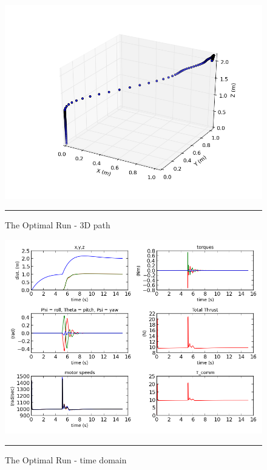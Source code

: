 \begin{figure}[htbp]
	\centering
		\includegraphics[width=\textwidth]{Figures/optimal_run_3D_path.png}
		\rule{35em}{0.5pt}
	\caption[optimal run 3D path]{The Optimal Run - 3D path}
	\label{fig:optimal run 3D path}
\end{figure}


\begin{figure}[htbp]
	\centering
		\includegraphics[width=\textwidth]{Figures/optimal_run_time_domain.png}
		\rule{35em}{0.5pt}
	\caption[optimal run time domain]{The Optimal Run - time domain}
	\label{fig:optimal run time domain}
\end{figure}



